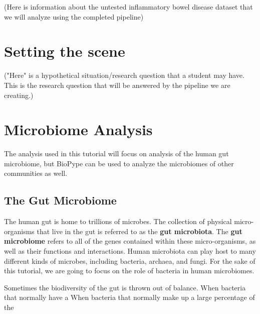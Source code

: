(Here is information about the untested inflammatory bowel disease dataset that we will analyze using the completed pipeline)

\chapter{Setting the scene}
    \label{chap:scene}
("Here" is a hypothetical situation/research question that a student may have. This is the research question that will be answered by the pipeline we are creating.)

\chapter{Microbiome Analysis}
The analysis used in this tutorial will focus on analysis of the human gut microbiome, but BioPype can be used to analyze the microbiomes of other communities as well.
\section{The Gut Microbiome}
%
The human gut is home to trillions of microbes. The collection of physical micro-organisms that live in the gut is referred to as the \textbf{gut microbiota}. The \textbf{gut microbiome} refers to all of the genes contained within these micro-organisms, as well as their functions and interactions.
%
%
Human microbiota can play host to many different kinds of microbes, including bacteria, archaea, and fungi. For the sake of this tutorial, we are going to focus on the role of bacteria in human microbiomes.

Sometimes the biodiversity of the gut is thrown out of balance. When bacteria that normally have a 
When bacteria that normally make up a large percentage of the 

